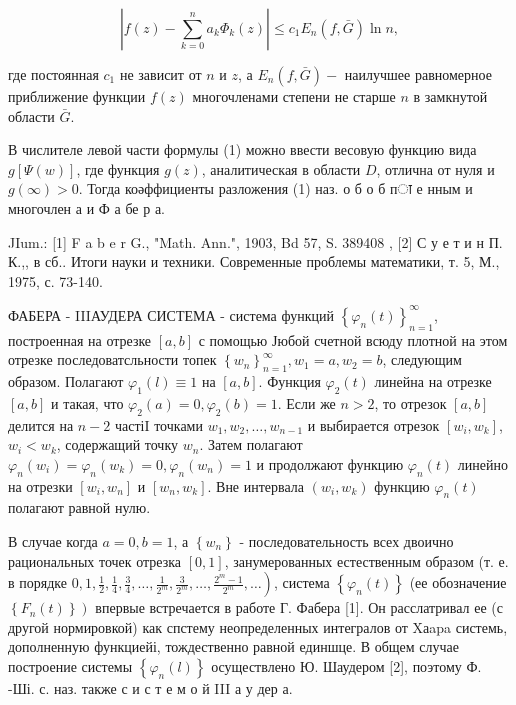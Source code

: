 \documentclass[10pt]{article}
\begin{document}
\[

\left|f(z)-\sum_{k=0}^{n} a_{k} \Phi_{k}(z)\right| \leqslant c_{1} E_{n}(f, \bar{G}) \ln n,

\]



где постоянная $c_{1}$ не зависит от $n$ и $z$, а $E_{n}(f, \bar{G})-$ наилучшее равномерное приближение функции $f(z)$ многочленами степени не старше $n$ в замкнутой области $\bar{G}$.



В числителе левой части формулы (1) можно ввести весовую функцию вида $g[\Psi(w)]$, где функция $g(z)$, аналитическая в области $D$, отлична от нуля и $g(\infty)>0$. Тогда коәффициенты разложения (1) наз. о б о б пा е нным и многочлен а и Ф а бе р а.



JIum.: [1] F a b e r G., "Math. Ann.", 1903, Bd 57, S. 389408 , [2] С у е т и н П. К.,, в сб.. Итоги науки и техники. Современные проблемы математики, т. 5, М., 1975, с. 73-140.



ФАБЕРА - IIIАУДЕРА СИСТЕМА - система функций $\left\{\varphi_{n}(t)\right\}_{n=1}^{\infty}$, построенная на отрезке $[a, b]$ с помощью Јюбой счетной всюду плотной на этом отрезке последоватсльности топек $\left\{w_{n}\right\}_{n=1}^{\infty}, w_{1}=a, w_{2}=b$, следующим образом. Полагают $\varphi_{1}(l) \equiv 1$ на $[a, b]$. Функция $\varphi_{2}(t)$ линейна на отрезке $[a, b]$ и такая, что $\varphi_{2}(a)=0, \varphi_{2}(b)=1$. Если же $n>2$, то отрезок $[a, b]$ делится на $n-2$ частіI точками $w_{1}, w_{2}, \ldots, w_{n-1}$ и выбирается отрезок $\left[w_{i}, w_{k}\right]$, $w_{i}<w_{k}$, содержащий точку $w_{n}$. Затем полагают $\varphi_{n}\left(w_{i}\right)=\varphi_{n}\left(w_{k}\right)=0, \varphi_{n}\left(w_{n}\right)=1$ и продолжают функцию $\varphi_{n}(t)$ линейно на отрезки $\left[w_{i}, w_{n}\right]$ и $\left[w_{n}, w_{k}\right]$. Вне интервала $\left(w_{i}, w_{k}\right)$ функцию $\varphi_{n}(t)$ полагают равной нулю.



В случае когда $a=0, b=1$, а $\left\{w_{n}\right\}$ - последовательность всех двоично рациональных точек отрезка $[0,1]$, занумерованных естественным образом (т. е. в порядке $\left.0,1, \frac{1}{2}, \frac{1}{4}, \frac{3}{4}, \ldots, \frac{1}{2^{m}}, \frac{3}{2^{m}}, \ldots, \frac{2^{m}-1}{2^{m}}, \ldots\right)$, система $\left\{\varphi_{n}(t)\right\}$ (ее обозначение $\left.\left\{F_{n}(t)\right\}\right)$ впервые встречается в работе Г. Фабера [1]. Он расслатривал ее (с другой нормировкой) как спстему неопределенных интегралов от Xаapa системь, дополненную функциейі, тождественно равной единшце. В общем случае построение системы $\left\{\varphi_{n}(l)\right\}$ осуществлено Ю. Шаудером [2], поэтому Ф. -Ші. с. наз. также с и с т е м о й III а у дер а.
\end{document}
